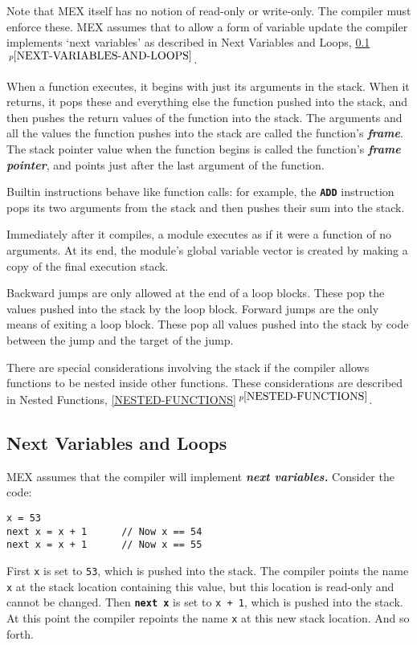 \documentclass[12pt]{article}
\newcommand{\TT}[1]{{\tt \bfseries #1}}
\newcommand{\key}[1]{{\bf \em #1}\index{#1}}
\newcommand{\skey}[2]{{\bf \em #1#2}\index{#1}}
\newcommand{\itemref}[1]{\ref{#1}$\,^{p\pageref{#1}}$}
\newenvironment{indpar}[1][0.3in]%
	{\begin{list}{}%
		     {\setlength{\itemsep}{0in}%
		      \setlength{\topsep}{0in}%
		      \setlength{\parsep}{1ex}%
		      \setlength{\labelwidth}{#1}%
		      \setlength{\leftmargin}{#1}%
		      \addtolength{\leftmargin}{\labelsep}}%
	 \item}%
	{\end{list}}
\begin{document}
Note that MEX itself has no notion of read-only or write-only.
The compiler must enforce these.  MEX assumes that to allow
a form of variable update the compiler implements `next variables'
as described in Next Variables and Loops, \itemref{NEXT-VARIABLES-AND-LOOPS}.

When a function executes, it begins with just its arguments
in the stack.  When it returns, it pops these and everything
else the function pushed into the stack, and then pushes
the return values of the function into the stack.
The arguments and all the values the function pushes into the
stack are called the function's \key{frame}.  The stack pointer
value when the function begins is called the function's
\key{frame pointer}, and points just after the last argument
of the function.

Builtin instructions behave like function calls: for example,
the \TT{ADD} instruction pops its two arguments from the stack
and then pushes their sum into the stack.

Immediately after it compiles, a module executes as if it were a function
of no arguments.  At its end, the module's
global variable vector is created by making
a copy of the final execution stack.

Backward jumps are only allowed at the end of a loop blocks.
These pop the values pushed into the stack by the loop block.
Forward jumps are the only means of exiting a loop block.  These
pop all values pushed into the stack by code between the jump
and the target of the jump.

There are special considerations involving the stack if the
compiler allows functions to be nested inside other functions.
These considerations are described in Nested Functions,
\itemref{NESTED-FUNCTIONS}.

\subsection{Next Variables and Loops}
\label{NEXT-VARIABLES-AND-LOOPS}

MEX assumes that the compiler will implement \skey{next variables}.
Consider the code:
\begin{indpar}\begin{verbatim}
x = 53
next x = x + 1      // Now x == 54
next x = x + 1      // Now x == 55
\end{verbatim}\end{indpar}
First {\tt x} is set to {\tt 53}, which is pushed into the stack.
The compiler points the name
{\tt x} at the stack location containing this value,
but this location is read-only and cannot be changed.
Then \TT{next x} is set to {\tt x + 1}, which is pushed into the stack.
At this point the compiler repoints the name {\tt x} at this new
stack location.  And so forth.
\end{document}
